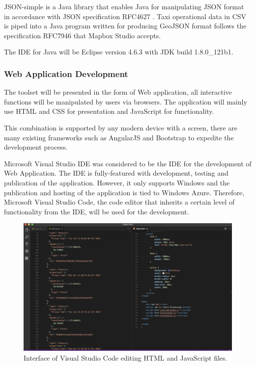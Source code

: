 \documentclass[11pt,a4paper]{article}
\begin{document}
JSON-simple \parencite{Fang} is a Java library that enables Java for manipulating JSON format in accordance with JSON specification RFC4627 \parencite{JSON}. Taxi operational data in CSV is piped into a Java program written for producing GeoJSON format follows the specification RFC7946 \parencite{GeoJSON} that Mapbox Studio accepts.

The IDE for Java will be Eclipse version 4.6.3 with JDK build 1.8.0\_121\-b1.
\subsubsection{Web Application Development}
The toolset will be presented in the form of Web application, all interactive functions will be manipulated by users via browsers. The application will mainly use HTML and CSS for presentation and JavaScript for functionality.

This combination is supported by any modern device with a screen, there are many existing frameworks such as AngularJS and Bootstrap to expedite the development process.

Microsoft Visual Studio IDE was considered to be the IDE for the development of Web Application. The IDE is fully-featured with development, testing and publication of the application. However, it only supports Windows and the publication and hosting of the application is tied to Windows Azure. Therefore, Microsoft Visual Studio Code, the code editor that inherits a certain level of functionality from the IDE, will be used for the development. 

\begin{figure}
	\centering
	\includegraphics[width=\textwidth,keepaspectratio]{figures/fig16.png}
	\caption{\label{fig:16}Interface of Visual Studio Code editing HTML and JavaScript files. }
\end{figure}
\end{document}
